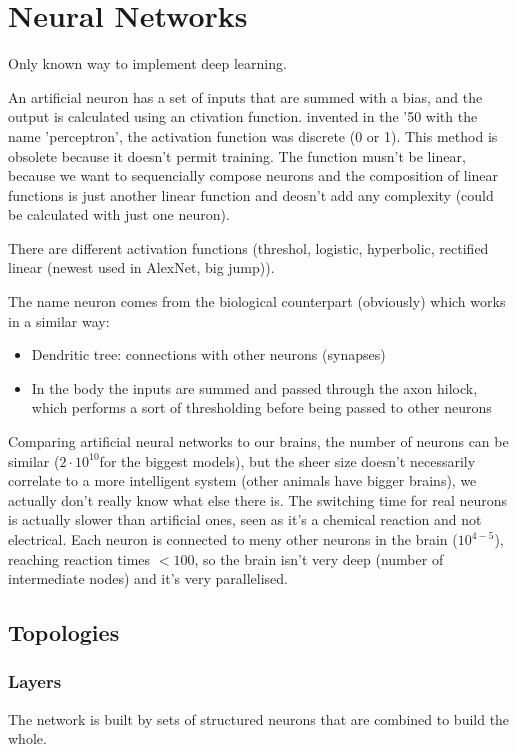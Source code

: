 % 
\chapter{Neural Networks}
Only known way to implement deep learning. 

An artificial neuron has a set of inputs that are summed with a bias, and the output is calculated using an ctivation function. invented in the '50 with the name 'perceptron', the activation function was discrete (0 or 1). This method is obsolete because it doesn't permit training. The function musn't be linear, because we want to sequencially compose neurons and the composition of linear functions is just another linear function and deosn't add any complexity (could be calculated with just one neuron). 

There are different activation functions (threshol, logistic, hyperbolic, rectified linear (newest used in AlexNet, big jump)). 

The name neuron comes from the biological counterpart (obviously) which works in a similar way:
\begin{itemize}
  \item Dendritic tree: connections with other neurons (synapses)
    \item In the body the inputs are summed and passed through the axon hilock, which performs a sort of thresholding before being passed to other neurons
\end{itemize}

Comparing artificial neural networks to our brains, the number of neurons can be similar ($ 2\cdot 10^{10} $for the biggest models), but the sheer size doesn't necessarily correlate to a more intelligent system (other animals have bigger brains), we actually don't really know what else there is. The switching time for real neurons is actually slower than artificial ones, seen as it's a chemical reaction and not electrical. Each neuron is connected to meny other neurons in the brain ($ 10^{4-5} $), reaching reaction times $ < 100 $, so the brain isn't very deep (number of intermediate nodes) and it's very parallelised.

\section{Topologies}

\subsection{Layers}
The network is built by sets of structured neurons that are combined to build the whole.

